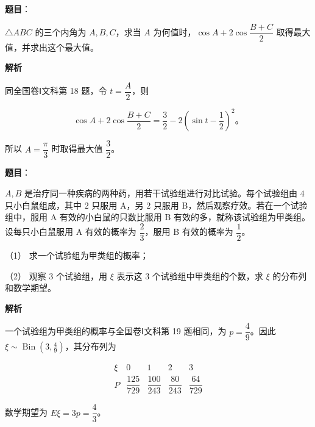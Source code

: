 \begin{answer}

\textbf{题目}：

$\triangle ABC$ 的三个内角为 $A,B,C$，求当 $A$ 为何值时，$\cos A+2\cos\dfrac{B+C}{2}$ 取得最大值，并求出这个最大值。

\textbf{解析}

同全国卷Ⅰ文科第 18 题，令 $t=\dfrac A2$，则

\nopagebreak[4]
\[
\cos A+2\cos\frac{B+C}{2}
=\frac32-2\left(\sin t-\frac12\right)^2\text{。}
\]

所以 $A=\dfrac\pi3$ 时取得最大值 $\dfrac32$。


\end{answer}
\begin{answer}

\textbf{题目}：

$A,B$ 是治疗同一种疾病的两种药，用若干试验组进行对比试验。每个试验组由 $4$ 只小白鼠组成，其中 $2$ 只服用 A，另 $2$ 只服用 B，然后观察疗效。若在一个试验组中，服用 A 有效的小白鼠的只数比服用 B 有效的多，就称该试验组为甲类组。设每只小白鼠服用 A 有效的概率为 $\dfrac23$，服用 B 有效的概率为 $\dfrac12$。

（1） 求一个试验组为甲类组的概率；

（2） 观察 $3$ 个试验组，用 $\xi$ 表示这 $3$ 个试验组中甲类组的个数，求 $\xi$ 的分布列和数学期望。

\textbf{解析}


一个试验组为甲类组的概率与全国卷Ⅰ文科第 19 题相同，为 $p=\dfrac49$。因此 $\xi\sim\operatorname{Bin}(3,\frac49)$，其分布列为

\nopagebreak[4]
\[
\begin{array}{c|cccc}
\xi&0&1&2&3\\ \hline
P&\dfrac{125}{729}&\dfrac{100}{243}&\dfrac{80}{243}&\dfrac{64}{729}
\end{array}
\]


数学期望为 $E\xi=3p=\dfrac43$。



\end{answer}
